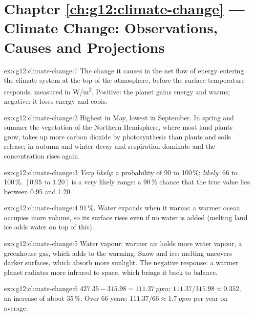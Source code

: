 \section*{Chapter \ref{ch:g12:climate-change} --- Climate Change: Observations, Causes and Projections}

\begin{solution}{exo:g12:climate-change:1}
The change it causes in the net flow of energy entering the climate system
at the top of the atmosphere, before the surface temperature responds;
measured in \unit{W/m^2}. Positive: the planet gains energy and warms;
negative: it loses energy and cools.
\end{solution}

\begin{solution}{exo:g12:climate-change:2}
Highest in May, lowest in September. In spring and summer the vegetation
of the Northern Hemisphere, where most land plants grow, takes up more
carbon dioxide by photosynthesis than plants and soils release; in autumn
and winter decay and respiration dominate and the concentration rises again.
\end{solution}

\begin{solution}{exo:g12:climate-change:3}
\emph{Very likely}: a probability of 90 to 100\,\%; \emph{likely}: 66 to
100\,\%. $[0.95 \text{ to } 1.20]$ is a very likely range: a 90\,\% chance that
the true value lies between 0.95 and 1.20.
\end{solution}

\begin{solution}{exo:g12:climate-change:4}
91\,\%. Water expands when it warms: a warmer ocean occupies more volume, so
its surface rises even if no water is added (melting land ice adds water on
top of this).
\end{solution}

\begin{solution}{exo:g12:climate-change:5}
Water vapour: warmer air holds more water vapour, a greenhouse gas, which adds
to the warming. Snow and ice: melting uncovers darker surfaces, which absorb
more sunlight. The negative response: a warmer planet radiates more infrared
to space, which brings it back to balance.
\end{solution}

\begin{solution}{exo:g12:climate-change:6}
$427.35 - 315.98 = \qty{111.37}{ppm}$; $111.37/315.98 \approx 0.352$, an
increase of about 35\,\%. Over 66 years: $111.37/66 \approx
\qty{1.7}{ppm}$ per year on average.
\end{solution}

